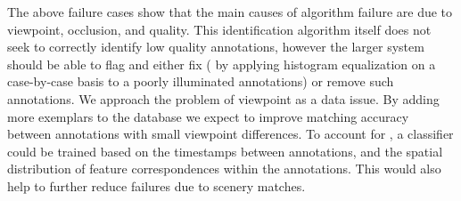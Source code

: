         The above failure cases show that the main causes of algorithm failure are due to viewpoint, occlusion,
          and quality.
        This identification algorithm itself does not seek to correctly identify low quality annotations, however
          the larger system should be able to flag and either fix (\eg{} by applying histogram equalization on a
          case-by-case basis to a poorly illuminated annotations) or remove such annotations.
        We approach the problem of viewpoint as a data issue.
        By adding more exemplars to the database we expect to improve matching accuracy between annotations with
          small viewpoint differences.
        To account for \photobombings{}, a classifier could be trained based on the timestamps between
          annotations, and the spatial distribution of feature correspondences within the annotations.
        This would also help to further reduce failures due to scenery matches.
        

           
